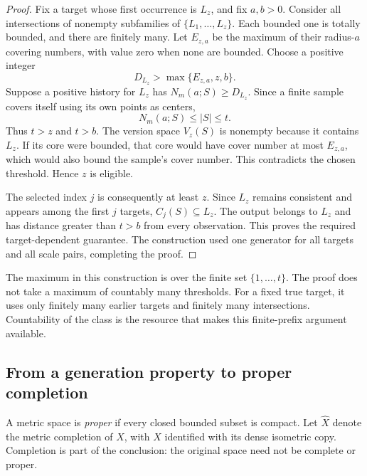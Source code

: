 \begin{proof}
Fix a target whose first occurrence is $L_z$, and fix $a,b>0$.
Consider all intersections of nonempty subfamilies of
$\{L_1,\ldots,L_z\}$. Each bounded one is totally bounded, and there
are finitely many. Let $E_{z,a}$ be the maximum of their radius-$a$
covering numbers, with value zero when none are bounded. Choose a
positive integer
\[
 D_{L_z}>\max\{E_{z,a},z,b\}.
\]
Suppose a positive history for $L_z$ has $N_m(a;S)\ge D_{L_z}$.
Since a finite sample covers itself using its own points as centers,
\[
 N_m(a;S)\le |S|\le t.
\]
Thus $t>z$ and $t>b$. The version space $V_z(S)$ is nonempty because
it contains $L_z$. If its core were bounded, that core would have cover
number at most $E_{z,a}$, which would also bound the sample's cover
number. This contradicts the chosen threshold. Hence $z$ is eligible.

The selected index $j$ is consequently at least $z$. Since $L_z$
remains consistent and appears among the first $j$ targets,
$C_j(S)\subseteq L_z$. The output belongs to $L_z$ and has distance
greater than $t>b$ from every observation. This proves the required
target-dependent guarantee. The construction used one generator for all
targets and all scale pairs, completing the proof.
\end{proof}

\begin{remark}
The maximum in this construction is over the finite set
$\{1,\ldots,t\}$. The proof does not take a maximum of countably many
thresholds. For a fixed true target, it uses only finitely many earlier
targets and finitely many intersections. Countability of the class is the
resource that makes this finite-prefix argument available.
\end{remark}

\subsection{From a generation property to proper completion}

A metric space is \emph{proper} if every closed bounded subset is compact.
Let $\widehat X$ denote the metric completion of $X$, with $X$ identified
with its dense isometric copy. Completion is part of the conclusion:
the original space need not be complete or proper.

